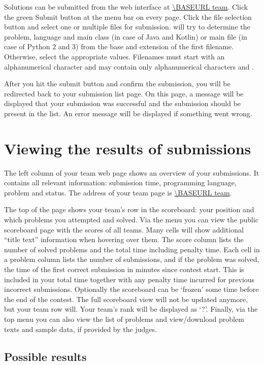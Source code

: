Solutions can be submitted from the web interface at \url{\BASEURL team}.
Click the green Submit button at the menu bar on every page.
Click the file selection button and select one or
multiple files for submission. \DOMjudge will try to determine the
problem, language and main class (in case of Java and Kotlin) or main file
(in case of Python 2 and 3) from the base and extension of the first filename.
Otherwise, select the appropriate values.
Filenames must start with an alphanumerical character and may contain only
alphanumerical characters and .

After you hit the submit button and confirm the submission, you will
be redirected back to your submission list page. On this page, a message
will be displayed that your submission was successful and the
submission should be present in the list. An error message will be
displayed if something went wrong.

\section{Viewing the results of submissions}

The left column of your team web page shows an overview of your submissions.
It contains all relevant information: submission time, programming
language, problem and status. The address of your team page is
\url{\BASEURL team}.

The top of the page shows your team's row in the scoreboard: your position and
which problems you attempted and solved. Via the menu you can view the public
scoreboard page with the scores of all teams. Many cells will show
additional ``title text'' information when hovering over them. The
score column lists the number of solved problems and the total time including
penalty time. Each cell in a problem column lists the number of submissions,
and if the problem was solved, the time of the first correct
submission in minutes since contest start. This is included in your
total time together with any penalty time incurred for previous
incorrect submissions. Optionally the scoreboard can
be `frozen' some time before the end of the contest. The full scoreboard view
will not be updated anymore, but your team row will. Your team's rank will
be displayed as `?'. Finally, via the top menu you can also view the
list of problems and view/download problem texts and sample data, if
provided by the judges.

\subsection{Possible results}

